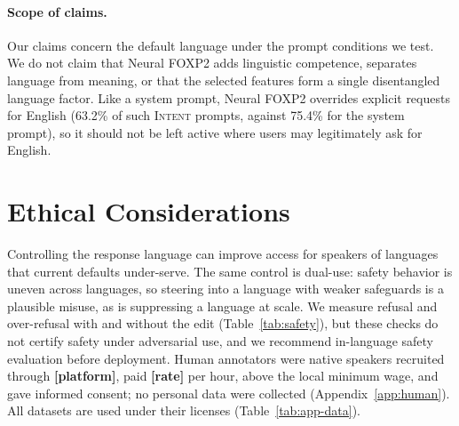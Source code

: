 \documentclass[11pt]{article}
\newcommand{\res}[1]{\textcolor{red!70!black}{\textbf{[#1]}}}
\newcommand{\foxp}{Neural FOXP2\xspace}
\newcommand{\intent}{\textsc{Intent}\xspace}
\begin{document}
\paragraph{Scope of claims.}
Our claims concern the default language under the prompt conditions we test. We do not claim that \foxp adds linguistic competence, separates language from meaning, or that the selected features form a single disentangled language factor. Like a system prompt, \foxp overrides explicit requests for English (63.2\% of such \intent prompts, against 75.4\% for the system prompt), so it should not be left active where users may legitimately ask for English.

\section*{Ethical Considerations}

Controlling the response language can improve access for speakers of languages that current defaults under-serve. The same control is dual-use: safety behavior is uneven across languages, so steering into a language with weaker safeguards is a plausible misuse, as is suppressing a language at scale. We measure refusal and over-refusal with and without the edit (Table~\ref{tab:safety}), but these checks do not certify safety under adversarial use, and we recommend in-language safety evaluation before deployment. Human annotators were native speakers recruited through \res{platform}, paid \res{rate} per hour, above the local minimum wage, and gave informed consent; no personal data were collected (Appendix~\ref{app:human}). All datasets are used under their licenses (Table~\ref{tab:app-data}).



\clearpage
\FloatBarrier
\appendix


\end{document}
